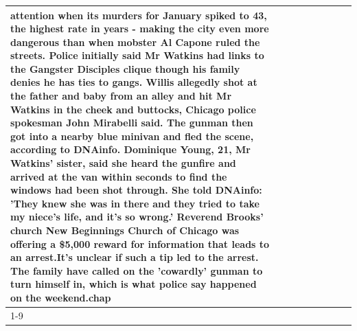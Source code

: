 \begin{table}[H]
\begin{tabular}{lllrlllll}
attention when its murders for January spiked to 43, the highest rate in years - making the city even more dangerous than when mobster Al Capone ruled the streets. Police initially said Mr Watkins had links to the Gangster Disciples clique though his family denies he has ties to gangs. Willis allegedly shot at the father and baby from an alley and hit Mr Watkins in the cheek and buttocks, Chicago police spokesman John Mirabelli said. The gunman then got into a nearby blue minivan and fled the scene, according to DNAinfo. Dominique Young, 21, Mr Watkins' sister, said she heard the gunfire and arrived at the van within seconds to find the windows had been shot through. She told DNAinfo: 'They knew she was in there and they tried to take my niece's life, and it's so wrong.' Reverend Brooks' church New Beginnings Church of Chicago was offering a \$5,000 reward for information that leads to an arrest.It's unclear if such a tip led to the arrest. The family have called on the 'cowardly' gunman to turn himself in, which is what police say happened on the weekend.chap \\
\cline{1-9}

\end{tabular}
\end{table}
